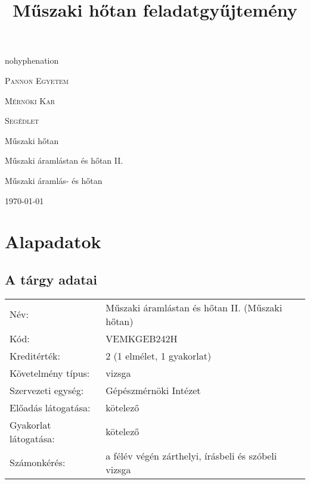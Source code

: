 \documentclass[11pt, a4paper]{report}
\author{}
\title{Műszaki hőtan feladatgyűjtemény}
\begin{document}
\begin{titlepage}
	\centering
	\begin{hyphenrules}{nohyphenation}
		{\scshape\LARGE Pannon Egyetem \par}
		{\scshape\LARGE Mérnöki Kar \par}
		\vspace{1cm}
		{\scshape\Large Segédlet\par}
		\vspace{1.5cm}
		\parbox{8cm}{{\centering\huge\bfseries{\JakiTitle} \par}}
		\vspace{2cm}
		{\Large\itshape\JakiAuthor\par}
		\vfill
		Műszaki hőtan \par
		Műszaki áramlástan és hőtan II.\par
		Műszaki áramlás- és hőtan

		\vfill

		{\large \today\par}
	\end{hyphenrules}
\end{titlepage}

\tableofcontents


\chapter*{Alapadatok}

\section*{A tárgy adatai}

\begin{tabular}{ l l }
Név: & Műszaki áramlástan és hőtan II. (Műszaki hőtan) \\
Kód: & VEMKGEB242H \\
Kreditérték: & 2 (1 elmélet, 1 gyakorlat) \\
Követelmény típus: & vizsga \\
Szervezeti egység: & Gépészmérnöki Intézet \\
Előadás látogatása: & kötelező \\
Gyakorlat látogatása: & kötelező \\
Számonkérés: & a félév végén zárthelyi, írásbeli és szóbeli vizsga \\
\end{tabular}
\end{document}
